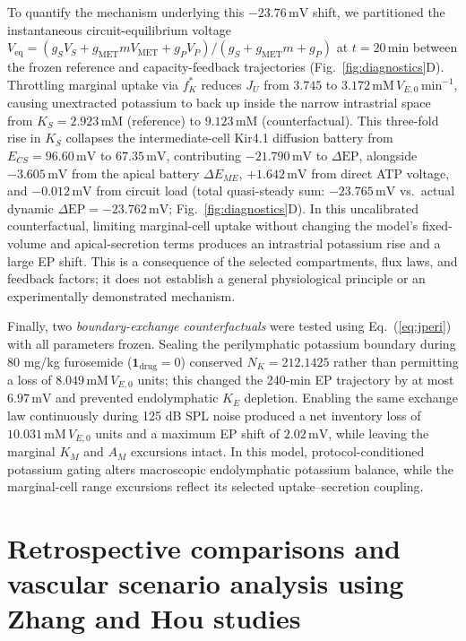 \documentclass[final,5p,times]{elsarticle}
\begin{document}
To quantify the mechanism underlying this \(-23.76\,\mathrm{mV}\) shift, we partitioned the instantaneous circuit-equilibrium voltage \(V_{\mathrm{eq}} = (g_S V_S + g_{\mathrm{MET}}m V_{\mathrm{MET}} + g_P V_P)/(g_S + g_{\mathrm{MET}}m + g_P)\) at \(t = 20\,\mathrm{min}\) between the frozen reference and capacity-feedback trajectories (Fig.~\ref{fig:diagnostics}D). Throttling marginal uptake via \(f_K^*\) reduces \(J_U\) from \(3.745\) to \(3.172\,\mathrm{mM}\,V_{E,0}\,\mathrm{min}^{-1}\), causing unextracted potassium to back up inside the narrow intrastrial space from \(K_S = 2.923\,\mathrm{mM}\) (reference) to \(9.123\,\mathrm{mM}\) (counterfactual). This three-fold rise in \(K_S\) collapses the intermediate-cell Kir4.1 diffusion battery from \(E_{CS} = 96.60\,\mathrm{mV}\) to \(67.35\,\mathrm{mV}\), contributing \(-21.790\,\mathrm{mV}\) to \(\Delta\mathrm{EP}\), alongside \(-3.605\,\mathrm{mV}\) from the apical battery \(\Delta E_{ME}\), \(+1.642\,\mathrm{mV}\) from direct ATP voltage, and \(-0.012\,\mathrm{mV}\) from circuit load (total quasi-steady sum: \(-23.765\,\mathrm{mV}\) vs.\ actual dynamic \(\Delta\mathrm{EP} = -23.762\,\mathrm{mV}\); Fig.~\ref{fig:diagnostics}D). In this uncalibrated counterfactual, limiting marginal-cell uptake without changing the model's fixed-volume and apical-secretion terms produces an intrastrial potassium rise and a large EP shift. This is a consequence of the selected compartments, flux laws, and feedback factors; it does not establish a general physiological principle or an experimentally demonstrated mechanism.

Finally, two \emph{boundary-exchange counterfactuals} were tested using Eq.~(\ref{eq:jperi}) with all parameters frozen. Sealing the perilymphatic potassium boundary during 80 mg/kg furosemide (\(\mathbf{1}_{\mathrm{drug}}=0\)) conserved \(N_K=212.1425\) rather than permitting a loss of \(8.049\,\mathrm{mM}\,V_{E,0}\) units; this changed the 240-min EP trajectory by at most \(6.97\,\mathrm{mV}\) and prevented endolymphatic \(K_E\) depletion. Enabling the same exchange law continuously during 125 dB SPL noise produced a net inventory loss of \(10.031\,\mathrm{mM}\,V_{E,0}\) units and a maximum EP shift of \(2.02\,\mathrm{mV}\), while leaving the marginal \(K_M\) and \(A_M\) excursions intact. In this model, protocol-conditioned potassium gating alters macroscopic endolymphatic potassium balance, while the marginal-cell range excursions reflect its selected uptake--secretion coupling.

\section{Retrospective comparisons and vascular scenario analysis using Zhang and Hou studies}\label{sec:benchmarks}
\end{document}
